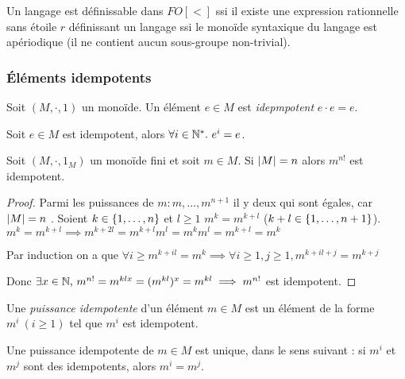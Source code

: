 


\begin{theorem}
	Un langage est définissable dans $FO[<]$ ssi il existe une expression rationnelle sans étoile $r$ définissant un langage
	ssi
	le monoïde syntaxique du langage est apériodique (\cad il ne contient aucun sous-groupe non-trivial).
\end{theorem}

\subsubsection{Éléments idempotents}

\begin{definition}
	Soit $(M,\cdot , 1)$ un monoïde. Un élément $e \in M$ est \emph{idepmpotent} \ssi $e \cdot e = e$.
\end{definition}

\begin{exercice} \label{ex:puiss-idemp}
	Soit $e \in M$ est idempotent, alors $\forall i \in \N^*. \ e^i = e$.
\end{exercice}

\begin{lemma}
	Soit $(M,\cdot , 1_M)$ un monoïde fini et soit $m \in M$. Si $\left|M\right| = n$ alors $m^{n!}$ est idempotent.
\end{lemma}

\begin{proof}
	Parmi les puissances de $m : m, \ldots , m^{n+1}$ il y  deux qui sont égales, car $\left|M\right| = n$ .
	Soient $k \in \left\{1,\ldots,n\right\}$ et $l \geq 1$ \tq $m ^{k} = m ^{k+l}$ ($k + l \in \left\{1,\ldots,n+1\right\}$).
	$m ^{k} = m ^{k+l} \implies m ^{k+2l} = m ^{k+l} m^l = m^k m^l = m^{k+l} = m^k$

	Par induction on a que $\forall i \geq m^{k+il} = m^{k} \implies \forall i \geq 1, j \geq 1, m^{k+il+ j} = m^{k +j}$

	Donc $\exists x \in \mathbb{N}, \, m^{n!} = m^{klx} = (m^{kl})^x = m^{kl} \implies m^{n!}$ est idempotent.
\end{proof}


\begin{definition}
	Une \emph{puissance idempotente} d'un élément $m \in M$ est un élément de la forme $m^i \ (i\geq 1)$ tel que $m^i$ est idempotent.
\end{definition}

\begin{lemma}\label{lem:puiss-idemp}
	Une puissance idempotente de $m \in M$ est unique, dans le sens suivant : si $m^i$ et $m^j$ sont des idempotents, alors $m^i = m^j$.
\end{lemma}

